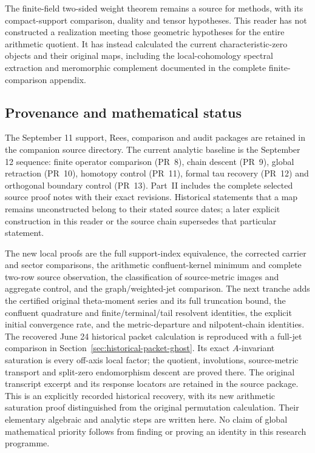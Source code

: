 The finite-field two-sided weight theorem remains a source for
methods, with its compact-support comparison, duality and
tensor hypotheses. This reader has not constructed a realization
meeting those geometric hypotheses for the entire arithmetic
quotient. It has instead calculated the current characteristic-zero
objects and their original maps, including the local-cohomology
spectral extraction and meromorphic complement documented in
the complete finite-comparison appendix.

\subsection{Provenance and mathematical status}
The September 11 support, Rees, comparison and audit packages
are retained in the companion source directory. The current
analytic baseline is the September 12 sequence: finite operator
comparison (PR~8), chain descent (PR~9), global retraction
(PR~10), homotopy control (PR~11), formal tau recovery (PR~12)
and orthogonal boundary control (PR~13).
Part~II includes the complete selected source proof notes with
their exact revisions. Historical statements that a map remains
unconstructed belong to their stated source dates; a later
explicit construction in this reader or the source chain
supersedes that particular statement.

The new local proofs are the full support-index equivalence,
the corrected carrier and sector comparisons, the arithmetic
confluent-kernel minimum and complete two-row source observation,
the classification of source-metric images and aggregate control,
and the graph/weighted-jet comparison.
The next tranche adds the certified original theta-moment series
and its full truncation bound, the confluent quadrature and
finite/terminal/tail resolvent identities, the explicit initial
convergence rate, and the metric-departure and nilpotent-chain
identities. The recovered June 24 historical packet calculation
is reproduced with a full-jet comparison in
Section~\ref{sec:historical-packet-ghost}. Its exact
\(A\)-invariant saturation is every off-axis local factor;
the quotient, involutions, source-metric transport and split-zero
endomorphism descent are proved there. The original transcript
excerpt and its response locators are retained in the source
package. This is an explicitly recorded historical recovery,
with its new arithmetic saturation proof distinguished from
the original permutation calculation.
Their elementary algebraic and analytic steps are written here.
No claim of global mathematical priority follows from finding
or proving an identity in this research programme.

